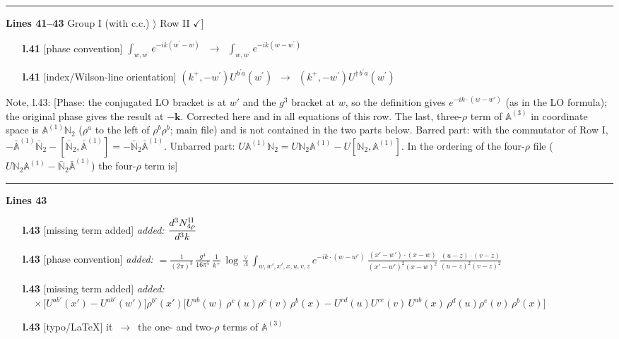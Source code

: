 \documentclass[10pt]{article}
\newenvironment{notebox}{\def\FrameCommand{{\color{notebar}\vrule width 1.5pt}\hspace{6pt}}\MakeFramed{\advance\hsize-\width\FrameRestore}\small}{\endMakeFramed}
\def\mf#1{\mathbb{#1}}
\begin{document}
\noindent\rule{\linewidth}{0.3pt}\par\noindent\textbf{Lines 41--43} \quad \textsf{Group I (with c.c.) $\rangle$ Row II { $\checkmark$]}} \par
\begin{itemize}[leftmargin=2.2em,itemsep=1pt,topsep=2pt]
\item[\textbf{l.41}] \textsf{\small [phase convention]} $\displaystyle \int_{w, w^\prime} e^{-ik(w^\prime-w)}\,$\ $\longrightarrow$\ $\displaystyle \int_{w, w^\prime} e^{-ik(w-w^\prime)}\,$
\item[\textbf{l.41}] \textsf{\small [index/Wilson-line orientation]} $\displaystyle (k^{+},-w^{\prime})U^{b^{\prime}a}(w^{\prime})$\ $\longrightarrow$\ $\displaystyle (k^{+},-w^{\prime})U^{\dagger\, b^{\prime}a}(w^{\prime})$
\end{itemize}
\begin{notebox}\textsf{\small Note, l.43:} [Phase: the conjugated LO bracket is at $w'$ and the $g^{3}$ bracket at $w$, so the definition gives $e^{-ik\cdot(w-w')}$ (as in the LO formula); the original phase gives the result at $-\mathbf{k}$. Corrected here and in all equations of this row. The last, three-$\rho$ term of $\mf{A}^{(3)}$ in coordinate space is $\mf{A}^{(1)}\mf{N}_{2}$ ($\rho^{a}$ to the left of $\rho^{b}\rho^{b}$; main file) and is not contained in the two parts below. Barred part: with the commutator of Row I, $-\bar{\mf{A}}^{(1)}\bar{\mf{N}}_{2}-[\bar{\mf{N}}_{2},\bar{\mf{A}}^{(1)}]=-\bar{\mf{N}}_{2}\bar{\mf{A}}^{(1)}$. Unbarred part: $U\mf{A}^{(1)}\mf{N}_{2}=U\mf{N}_{2}\mf{A}^{(1)}-U[\mf{N}_{2},\mf{A}^{(1)}]$. In the ordering of the four-$\rho$ file ($U\mf{N}_{2}\mf{A}^{(1)}-\bar{\mf{N}}_{2}\bar{\mf{A}}^{(1)}$) the four-$\rho$ term is]\end{notebox}
\noindent\rule{\linewidth}{0.3pt}\par\noindent\textbf{Lines 43} \par
\begin{itemize}[leftmargin=2.2em,itemsep=1pt,topsep=2pt]
\item[\textbf{l.43}] \textsf{\small [missing term added]} \emph{added:} $\displaystyle \frac{d^{3}N^{\rm II}_{4\rho}}{d^{3}k}$
\item[\textbf{l.43}] \textsf{\small [phase convention]} \emph{added:} $\displaystyle = \frac{1}{(2\pi)^{3}}\,\frac{g^{4}}{16\pi^{5}}\,\frac{1}{k^{+}}\,\log\frac{\vee}{\Lambda}\int_{w,w',x',x,u,v,z}e^{-ik\cdot(w-w')}\,\frac{(x'-w')\cdot(x-w)}{(x'-w')^{2}(x-w)^{2}}\,\frac{(u-z)\cdot(v-z)}{(u-z)^{2}(v-z)^{2}}$
\item[\textbf{l.43}] \textsf{\small [missing term added]} \emph{added:} $\displaystyle \quad\times\big[U^{ab'}(x')-U^{ab'}(w')\big]\rho^{b'}(x')\Big[U^{ab}(w)\,\rho^{c}(u)\rho^{c}(v)\,\rho^{b}(x)-U^{cd}(u)U^{ce}(v)\,U^{ab}(x)\,\rho^{d}(u)\rho^{e}(v)\,\rho^{b}(x)\Big]$
\item[\textbf{l.43}] \textsf{\small [typo/LaTeX]} it\ $\longrightarrow$\ the one- and two-$\rho$ terms of $\mf{A}^{(3)}$
\end{itemize}
\end{document}
